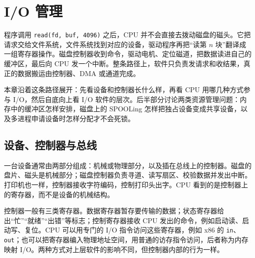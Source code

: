 \section{I/O 管理}

程序调用 \texttt{read(fd, buf, 4096)} 之后，CPU 并不会直接去拨动磁盘的磁头。它把请求交给文件系统，文件系统找到对应的设备，驱动程序再把“读第 $n$ 块”翻译成一组寄存器操作。磁盘控制器收到命令，驱动电机、定位磁道，把数据读进自己的缓冲区，最后向 CPU 发一个中断。整条路径上，软件只负责发请求和收结果，真正的数据搬运由控制器、DMA 或通道完成。

本章沿着这条路径展开：先看设备和控制器长什么样，再看 CPU 用哪几种方式参与 I/O，然后自底向上看 I/O 软件的层次。后半部分讨论两类资源管理问题：内存中的缓冲区怎样安排，磁盘上的 SPOOLing 怎样把独占设备变成共享设备，以及多进程申请设备时怎样分配才不会死锁。

\subsection{设备、控制器与总线}

一台设备通常由两部分组成：机械或物理部分，以及插在总线上的控制器。磁盘的盘片、磁头是机械部分；磁盘控制器负责寻道、读写扇区、校验数据并发出中断。打印机也一样，控制器接收字符编码，控制打印头出字。CPU 看到的是控制器上的寄存器，而不是设备的机械结构。

控制器一般有三类寄存器。数据寄存器暂存要传输的数据；状态寄存器给出“忙”“就绪”“出错”等标志；控制寄存器接收 CPU 发出的命令，例如启动读、启动写、复位。CPU 可以用专门的 I/O 指令访问这些寄存器，例如 x86 的 \texttt{in}、\texttt{out}；也可以把寄存器编入物理地址空间，用普通的访存指令访问，后者称为内存映射 I/O。两种方式对上层软件的影响不同，但控制器内部的行为一样。

